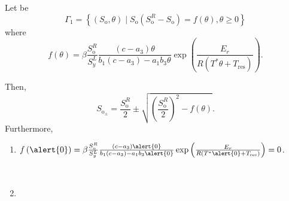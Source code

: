 \documentclass[
    8pt,
    aspectratio=1610,
    c,
    intlimits,
    leqno,
    professionalfonts,
]{beamer}
\begin{document}
\begin{frame}
	Let be
	\begin{equation*}
		\Gamma_{1}=
		\left\{
		\left(S_{\text{o}},\theta\right)\mid
		S_{\text{o}}
		\left(
		S^{R}_{\text{o}}-
		S_{\text{o}}
		\right)=
		f\left(\theta\right),\theta\geq0
		\right\}
	\end{equation*}
	where
	\begin{equation*}
		f\left(\theta\right)=
		\beta
		\frac{S^{R}_{\text{o}}}{S^{L}_{y}}
		\frac{
			\left(c-a_{3}\right)\theta}{
			b_{1}
			\left(c-a_{3}\right)-
			a_{1}
			b_{3}
			\theta
		}
		\exp
		\left(
		\frac{E_{r}}{
			R\left(T^{\ast}\theta+T_{\text{res}}\right)
		}
		\right).
	\end{equation*}

	Then,
	\begin{equation*}
		S_{\text{o}_{\pm}}=
		\frac{S^{R}_{\text{o}}}{2}\pm
		\sqrt{{\left(\frac{S^{R}_{\text{o}}}{2}\right)}^{2}-f\left(\theta\right)}.
	\end{equation*}
	Furthermore,
	\begin{enumerate}
		\item

		      \begin{math}
			      f\left(\alert{0}\right)=
			      \beta
			      \frac{S^{R}_{\text{o}}}{S^{L}_{y}}
			      \frac{
				      \left(c-a_{3}\right)\alert{0}}{
				      b_{1}
				      \left(c-a_{3}\right)-
				      a_{1}
				      b_{3}
				      \alert{0}
			      }
			      \exp
			      \left(
			      \frac{E_{r}}{
				      R\left(T^{\ast}\alert{0}+T_{\text{res}}\right)
			      }
			      \right)=0
		      \end{math}.

		      \

		\item


\end{enumerate}
\end{frame}
\end{document}
